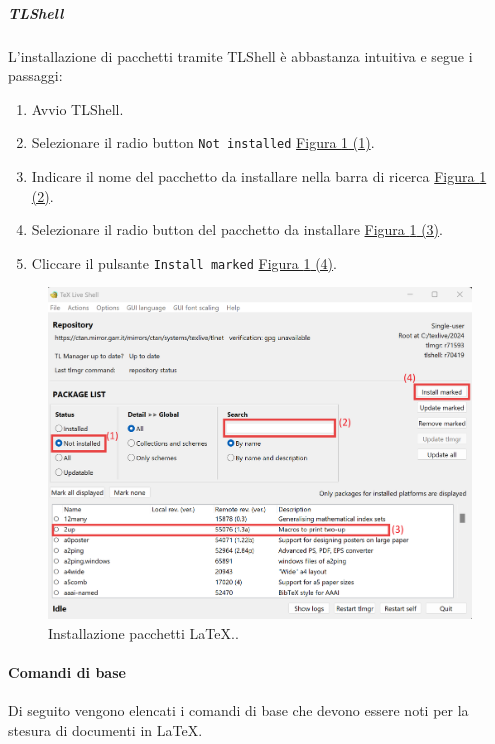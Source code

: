 \subparagraph{TLShell}
\label{subpar:TLShell}
L'installazione di pacchetti tramite TLShell è abbastanza intuitiva e segue i passaggi:
\begin{enumerate}
    \item Avvio TLShell.
    \item Selezionare il radio button \texttt{Not installed} \hyperref[fig:installazione_pacchetti]{Figura \ref{fig:installazione_pacchetti} (1)}.
    \item Indicare il nome del pacchetto da installare nella barra di ricerca \hyperref[fig:installazione_pacchetti]{Figura \ref{fig:installazione_pacchetti} (2)}.
    \item Selezionare il radio button del pacchetto da installare \hyperref[fig:installazione_pacchetti]{Figura \ref{fig:installazione_pacchetti} (3)}.
    \item Cliccare il pulsante \texttt{Install marked} \hyperref[fig:installazione_pacchetti]{Figura \ref{fig:installazione_pacchetti} (4)}.
\end{enumerate}
\begin{figure}
    \includegraphics[scale=0.7]{Sezioni/ProcessiDiSupporto/Immagini/installazione_pacchetti.png}
    \caption{Installazione pacchetti LaTeX..}
    \label{fig:installazione_pacchetti}
\end{figure}

\paragraph{Comandi di base}
\label{par:comandi_di_base}
Di seguito vengono elencati i comandi di base che devono essere noti per la stesura di documenti in LaTeX.

